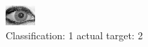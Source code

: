 \begin{figure}[h!]
\begin{center}
\includegraphics[width=0.60\columnwidth]{figures/ID2017_class_1_target_2.png}
\end{center}
\caption{ Classification: 1 actual target: 2}
\label{fig:ID2017_class_1_target_2}
\end{figure}
